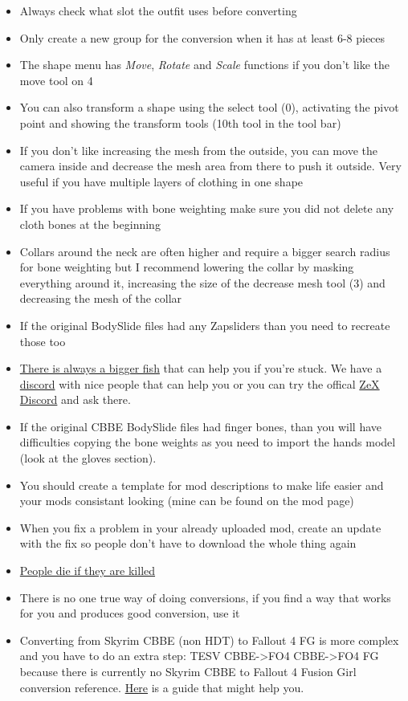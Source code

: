 \begin{itemize}
    \item Always check what slot the outfit uses before converting
    \item Only create a new group for the conversion when it has at least 6-8 pieces
    \item The shape menu has \textit{Move}, \textit{Rotate} and \textit{Scale} functions if you don't like the move tool on 4
    \item You can also transform a shape using the select tool (0), activating the pivot point and showing the transform tools 
    (10th tool in the tool bar)
    \item If you don't like increasing the mesh from the outside, you can move the camera inside and decrease the mesh area from there 
    to push it outside. Very useful if you have multiple layers of clothing in one shape
    \item If you have problems with bone weighting make sure you did not delete any cloth bones at the beginning
    \item Collars around the neck are often higher and require a bigger search radius for bone weighting but I recommend lowering the 
    collar by masking everything around it, increasing the size of the decrease mesh tool (3) and decreasing the mesh of the collar
    \item If the original BodySlide files had any Zapsliders than you need to recreate those too
    \item \href{https://www.youtube.com/watch?v=IIQVAShJzLo&t=1m15s}{There is always a bigger fish} that can help you if you're stuck.
    We have a \href{https://discord.gg/JakcQPN}{discord} with nice people that can help you or you can try the offical 
    \href{https://discord.gg/PNqYQpG}{ZeX Discord} and ask there.
    \item If the original CBBE BodySlide files had finger bones, than you will have difficulties copying the bone weights as you 
    need to import the hands model (look at the gloves section).
    \item You should create a template for mod descriptions to make life easier and your mods consistant looking (mine can be found on the mod page)
    \item When you fix a problem in your already uploaded mod, create an update with the fix so people don't have to download the whole thing again
    \item \href{https://i3.kym-cdn.com/photos/images/original/000/070/976/PEOPLE_DIE_IF_THEY_ARE_KILLED.jpg}{People die if they are killed}
    \item There is no one true way of doing conversions, if you find a way that works for you and produces good conversion, use it
    \item Converting from Skyrim CBBE (non HDT) to Fallout 4 FG is more complex and you have to do an extra step: TESV CBBE->FO4 CBBE->FO4 FG 
    because there is currently no Skyrim CBBE to Fallout 4 Fusion Girl conversion reference. \href{https://www.nexusmods.com/fallout4/mods/21111}{Here} 
    is a guide that might help you.
\end{itemize}
